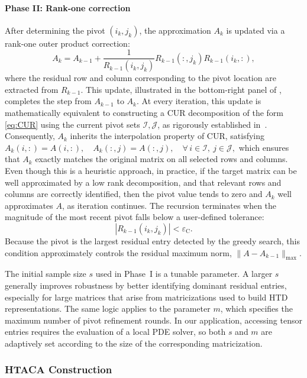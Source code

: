 \documentclass{article}
\theoremstyle{plain}
\theoremstyle{definition}
\theoremstyle{remark}
\begin{document}
\paragraph{Phase II: Rank-one correction}
After determining the pivot \( (i_k, j_k) \), the approximation \( A_k \) is updated via a rank-one outer product correction:
\begin{equation}\label{eq:matrix_aca_rank_one_correction}
    A_k = A_{k-1} + \frac{1}{R_{k-1}(i_k, j_k)} R_{k-1}(:, j_k) R_{k-1}(i_k, :),
\end{equation}
where the residual row and column corresponding to the pivot location are extracted from \( R_{k-1} \). This update, illustrated in the bottom-right panel of , completes the step from \( A_{k-1} \) to \( A_k \).  
At every iteration, this update is mathematically equivalent to constructing a CUR decomposition of the form \eqref{eq:CUR} using the current pivot sets \(\mathcal{I},\mathcal{J}\), as rigorously established in~\cite{shi2024distributed}.  
Consequently, \(A_k\) inherits the interpolation property of CUR, satisfying
\(
A_k(i,:) = A(i,:),\quad A_k(:,j) = A(:,j), \quad \forall\, i \in \mathcal{I},\ j \in \mathcal{J},
\)
which ensures that \(A_k\) exactly matches the original matrix on all selected rows and columns. Even though this is a heuristic approach, in practice, if the target matrix can be well approximated by a low rank decomposition, and that relevant rows and columns are correctly identified, then the pivot value tends to zero and $A_k$ well approximates $A$, as iteration continues. The recursion terminates when the magnitude of the most recent pivot falls below a user-defined tolerance:
\[
|R_{k-1}(i_k, j_k)| < \varepsilon_{\mathrm{C}}.
\]
Because the pivot is the largest residual entry detected by the greedy search, this condition approximately controls the residual maximum norm, \(\|A - A_{k-1}\|_{\max}\).

The initial sample size $s$ used in Phase~I is a tunable parameter. A larger $s$ generally improves robustness by better identifying dominant residual entries, especially for large matrices that arise from matricizations used to build HTD representations. The same logic applies to the parameter $m$, which specifies the maximum number of pivot refinement rounds. In our application, accessing tensor entries requires the evaluation of a local PDE solver, so both $s$ and $m$ are adaptively set according to the size of the corresponding matricization.

\subsubsection{HTACA Construction}\label{subsec:HTACA}
\end{document}

